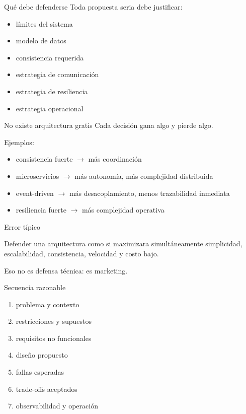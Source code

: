\documentclass[institutional,screen,none]{ua-engineering-v6-beamer}
\begin{document}
\begin{frame}{Qué debe defenderse}
Toda propuesta seria debe justificar:
\begin{itemize}
\item límites del sistema
\item modelo de datos
\item consistencia requerida
\item estrategia de comunicación
\item estrategia de resiliencia
\item estrategia operacional
\end{itemize}
\end{frame}


\begin{frame}{No existe arquitectura gratis}
Cada decisión gana algo y pierde algo.

\pause

Ejemplos:
\begin{itemize}
\item consistencia fuerte $\rightarrow$ más coordinación
\item microservicios $\rightarrow$ más autonomía, más complejidad distribuida
\item event-driven $\rightarrow$ más desacoplamiento, menos trazabilidad inmediata
\item resiliencia fuerte $\rightarrow$ más complejidad operativa
\end{itemize}
\end{frame}

\begin{frame}{Error típico}
\begin{alertblock}{}
Defender una arquitectura como si maximizara simultáneamente simplicidad, escalabilidad, consistencia, velocidad y costo bajo.
\end{alertblock}

\pause

Eso no es defensa técnica: es marketing.
\end{frame}


\begin{frame}{Secuencia razonable}
\begin{enumerate}
\item problema y contexto
\item restricciones y supuestos
\item requisitos no funcionales
\item diseño propuesto
\item fallas esperadas
\item trade-offs aceptados
\item observabilidad y operación
\end{enumerate}
\end{frame}
\end{document}
